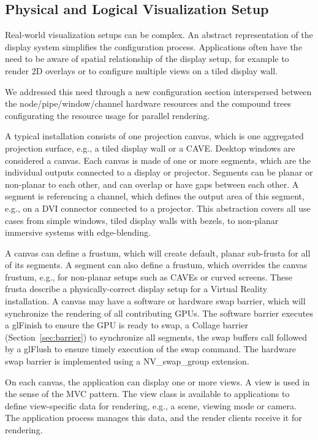 \documentclass[10pt,journal,compsoc]{IEEEtran}
\newcommand{\sref}[1]{Section~\ref{#1}}
\begin{document}
\subsection{Physical and Logical Visualization Setup}

Real-world visualization setups can be complex. An abstract representation of
the display system simplifies the configuration process. Applications often have
the need to be aware of spatial relationship of the display setup, for example
to render 2D overlays or to configure multiple views on a tiled display wall.

We addressed this need through a new configuration section interspersed between
the node/pipe/window/channel hardware resources and the compound trees
configurating the resource usage for parallel rendering.

A typical installation consists of one projection canvas, which is one
aggregated projection surface, e.g., a tiled display wall or a CAVE. Desktop
windows are considered a canvas. Each canvas is made of one or more segments,
which are the individual outputs connected to a display or projector. Segments
can be planar or non-planar to each other, and can overlap or have gaps between
each other. A segment is referencing a channel, which defines the output area of
this segment, e.g., on a DVI connector connected to a projector. This
abstraction covers all use cases from simple windows, tiled display walls with
bezels, to non-planar immersive systems with edge-blending.

A canvas can define a frustum, which will create default, planar sub-frusta for
all of its segments. A segment can also define a frustum, which overrides the
canvas frustum, e.g., for non-planar setups such as CAVEs or curved screens.
These frusta describe a physically-correct display setup for a Virtual Reality
installation. \label{sec:swap} A canvas may have a software or hardware swap
barrier, which will synchronize the rendering of all contributing GPUs. The
software barrier executes a \textsf{glFinish} to ensure the GPU is ready to
swap, a \textsf{Collage} barrier (\sref{sec:barrier}) to synchronize all
segments, the swap buffers call followed by a \textsf{glFlush} to ensure timely
execution of the swap command. The hardware swap barrier is implemented using a
\textsf{NV\_swap\_group} extension.

On each canvas, the application can display one or more views. A view is used in
the sense of the MVC pattern. The view class is available to applications to
define view-specific data for rendering, e.g., a scene, viewing mode or camera.
The application process manages this data, and the render clients receive it for
rendering.
\end{document}
